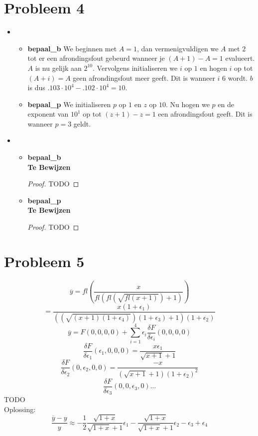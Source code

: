 \documentclass[12pt,a4paper]{article}
\begin{document}
\section{Probleem 4}
\begin{itemize}
\item
\begin{itemize}
\item \textbf{bepaal\_b}
We beginnen met $A=1$, dan vermenigvuldigen we $A$ met $2$ tot er een afrondingsfout gebeurd wanneer je $(A+1)-A=1$ evalueert. 
$A$ is nu gelijk aan $2^{10}$. Vervolgens initialiseren we $i$ op $1$ en hogen $i$ op tot $(A+i)=A$ geen afrondingsfout meer geeft. Dit is wanneer $i$ $6$ wordt. $b$ is dus $.103\cdot 10^4-.102\cdot 10^4=10$.
\item \textbf{bepaal\_p}
We initialiseren $p$ op $1$ en $z$ op $10$. Nu hogen we $p$ en de exponent van $10^1$ op tot $(z+1)-z=1$ een afrondingsfout geeft.
Dit is wanneer $p=3$ geldt. 
\end{itemize}
\item
\begin{itemize}
\item \textbf{bepaal\_b}\\
\textbf{Te Bewijzen}
\begin{proof}
TODO
\end{proof}
\item \textbf{bepaal\_p}\\
\textbf{Te Bewijzen}
\begin{proof}
TODO
\end{proof}
\end{itemize}
\end{itemize}

\section{Probleem 5}
\[
\overline{y} =
fl\left(
\frac{x}{fl\left(fl\left(\sqrt{fl\left(x+1\right)}\right)+1\right)}
\right)
\]
\[
=
\frac{x(1+\epsilon_1)}{\left(\left(\sqrt{\left(x+1\right)(1+\epsilon_4)}\right)(1+\epsilon_3)+1\right)(1+\epsilon_2)}
\]
\[
\overline{y} = F(0,0,0,0) + \sum_{i=1}^4\epsilon_i\frac{\delta F}{\delta\epsilon_i}(0,0,0,0)
\]
\[
\frac{\delta F}{\delta \epsilon_1}(\epsilon_1,0,0,0)
= \frac{x\epsilon_1}{\sqrt{x+1}+1}
\]
\[
\frac{\delta F}{\delta \epsilon_2}(0,\epsilon_2,0,0)
= \frac{-x}{\left(\sqrt{x+1}+1\right)(1+\epsilon_2)^2}
\]
\[
\frac{\delta F}{\delta \epsilon_3}(0,0,\epsilon_3,0)
...
\]
TODO\\
Oplossing:
\[
\frac{\overline{y}-y}{y} \approx -\frac{1}{2}\frac{\sqrt{1+x}}{\sqrt{1+x}+1}\epsilon_1 - \frac{\sqrt{1+x}}{\sqrt{1+x}+1}\epsilon_2 - \epsilon_3+\epsilon_4
\]
\end{document}
